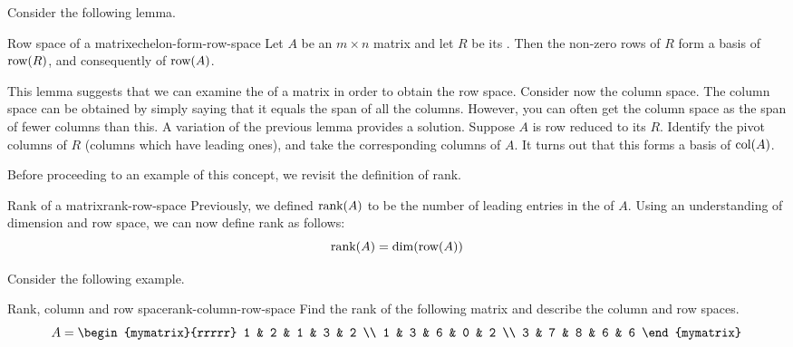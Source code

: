 Consider the following lemma. 

\begin{lemma}{Row space of a {\ef} matrix}{echelon-form-row-space}
Let $A$ be an $m \times n$ matrix and let $R$ be its {\ef}. Then the non-zero rows of $R$ form a basis of $\mbox{\rm row}(R)$, and consequently of $\mbox{\rm row}(A)$. 
\end{lemma}

This lemma suggests that we can examine the {\ef} of a matrix in order to obtain the row space. Consider now the column space. The column space can be obtained by simply saying that
it equals the span of all the columns. However, you can often get the column
space as the span of fewer columns than this. A variation of the previous lemma provides a solution. Suppose $A$ is row reduced to its {\ef} $R$. Identify the pivot columns of $R$ (columns which have leading ones), and take the corresponding columns of $A$. It turns out that this forms a basis of $\mbox{\rm col}(A)$. 

Before proceeding to an example of this concept, we revisit the definition of rank. 

\begin{definition}{Rank of a matrix}{rank-row-space}
Previously, we defined $\mbox{\rm rank}(A)$ to be the number of leading entries in the {\ef} of $A$. Using an understanding of dimension and row space, we can now define rank as follows:
\[
\mbox{rank}(A) = \dim(\mbox{\rm row}(A))
\]
\end{definition}

Consider the following example. 

\begin{example}{Rank, column and row space}{rank-column-row-space}
Find the rank of the following matrix and describe the column and row spaces.
\begin{equation*}
A = 
\begin{mymatrix}{rrrrr}
1 & 2 & 1 & 3 & 2 \\
1 & 3 & 6 & 0 & 2 \\
3 & 7 & 8 & 6 & 6
\end{mymatrix}  
\end{equation*}
\end{example}

